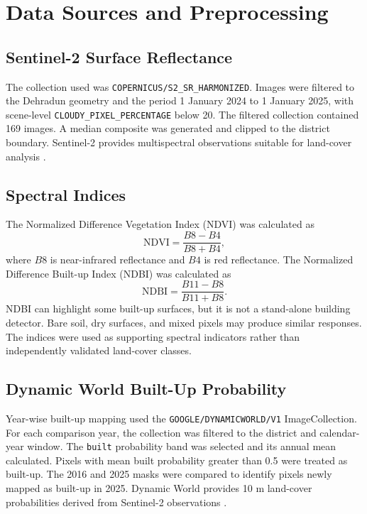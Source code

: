 \documentclass[conference]{IEEEtran}
\begin{document}
\section{Data Sources and Preprocessing}
\subsection{Sentinel-2 Surface Reflectance}
The collection used was \texttt{COPERNICUS/S2\_SR\_HARMONIZED}. Images were filtered to the Dehradun geometry and the period 1 January 2024 to 1 January 2025, with scene-level \texttt{CLOUDY\_PIXEL\_PERCENTAGE} below 20. The filtered collection contained 169 images. A median composite was generated and clipped to the district boundary. Sentinel-2 provides multispectral observations suitable for land-cover analysis \cite{esaSentinel2,geeS2}.

\subsection{Spectral Indices}
The Normalized Difference Vegetation Index (NDVI) was calculated as
\begin{equation}
\mathrm{NDVI}=\frac{B8-B4}{B8+B4},
\end{equation}
where $B8$ is near-infrared reflectance and $B4$ is red reflectance. The Normalized Difference Built-up Index (NDBI) was calculated as
\begin{equation}
\mathrm{NDBI}=\frac{B11-B8}{B11+B8}.
\end{equation}
NDBI can highlight some built-up surfaces, but it is not a stand-alone building detector. Bare soil, dry surfaces, and mixed pixels may produce similar responses. The indices were used as supporting spectral indicators rather than independently validated land-cover classes.

\subsection{Dynamic World Built-Up Probability}
Year-wise built-up mapping used the \texttt{GOOGLE/DYNAMICWORLD/V1} ImageCollection. For each comparison year, the collection was filtered to the district and calendar-year window. The \texttt{built} probability band was selected and its annual mean calculated. Pixels with mean built probability greater than 0.5 were treated as built-up. The 2016 and 2025 masks were compared to identify pixels newly mapped as built-up in 2025. Dynamic World provides 10 m land-cover probabilities derived from Sentinel-2 observations \cite{brown2022,geeDynamic}.
\end{document}
